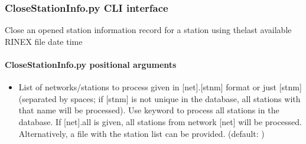 \documentclass[letterpaper,10pt,english]{sphinxmanual}
\begin{document}
\begin{fulllineitems}
\label{\detokenize{com:com.CloseStationInfo.main}}
\pysigstartsignatures
{}
\pysigstopsignatures
\end{fulllineitems}



\subsubsection{CloseStationInfo.py \sphinxhyphen{} CLI interface}
\label{\detokenize{com:CloseStationInfo.py---CLI-interface}}
\sphinxAtStartPar
Close an opened station information record for a station using thelast available RINEX file date time

\begin{sphinxVerbatim}[commandchars=\\\{\}]
 \PYG{p}{[}\PYG{p}{]}  \PYG{p}{[} \PYG{p}{]}
\end{sphinxVerbatim}


\paragraph{CloseStationInfo.py positional arguments}
\label{\detokenize{com:CloseStationInfo.py-positional-arguments}}\begin{itemize}
\item {} 
\sphinxAtStartPar
{\hyperref[\detokenize{com:CloseStationInfo.py-all|net.stnm}]{}} \sphinxhyphen{} List of networks/stations to process given in {[}net{]}.{[}stnm{]} format or just {[}stnm{]} (separated by spaces; if {[}stnm{]} is not unique in the database, all stations with that name will be processed). Use keyword  to process all stations in the database. If {[}net{]}.all is given, all stations from network {[}net{]} will be processed. Alternatively, a file with the station list can be provided. (default: )

\end{itemize}
\end{document}
